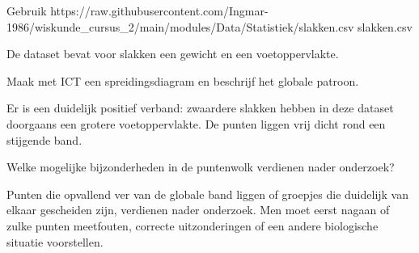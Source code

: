 \documentclass{ximera}
\begin{document}
\begin{oefening}{\oefU}

Gebruik \csv
{https://raw.githubusercontent.com/Ingmar-1986/wiskunde_cursus_2/main/modules/Data/Statistiek/slakken.csv}
{slakken.csv}

De dataset bevat voor slakken een gewicht en een voetoppervlakte.

\begin{question}
Maak met ICT een spreidingsdiagram en beschrijf het globale patroon.

\begin{oplossing}
Er is een duidelijk positief verband: zwaardere slakken hebben in deze
dataset doorgaans een grotere voetoppervlakte. De punten liggen vrij
dicht rond een stijgende band.
\end{oplossing}
\end{question}

\begin{question}
Welke mogelijke bijzonderheden in de puntenwolk verdienen nader
onderzoek?

\begin{oplossing}
Punten die opvallend ver van de globale band liggen of groepjes die
duidelijk van elkaar gescheiden zijn, verdienen nader onderzoek.
Men moet eerst nagaan of zulke punten meetfouten, correcte uitzonderingen
of een andere biologische situatie voorstellen.
\end{oplossing}
\end{question}

\end{oefening}
\end{document}
